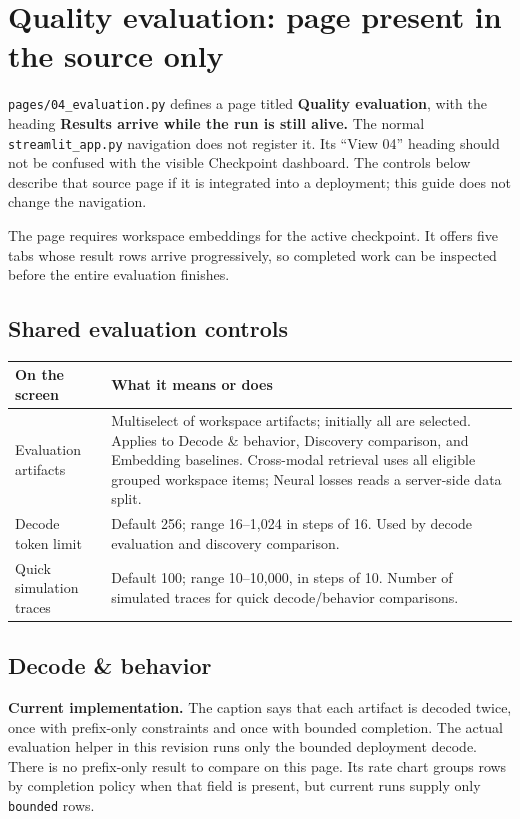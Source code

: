 \documentclass[11pt,a4paper]{article}
\makeatletter
\newcommand{\ui}[1]{\textbf{#1}}
\newcommand{\code}[1]{\nolinkurl{#1}}
\newenvironment{controls}{%
  \small\begin{longtable}{@{}>{\raggedright\arraybackslash}p{.34\linewidth}
    >{\raggedright\arraybackslash}p{.62\linewidth}@{}}
  \toprule\textbf{On the screen} & \textbf{What it means or does}\\\midrule\endhead
  \bottomrule\endfoot
}{\end{longtable}\normalsize}
\makeatother
\begin{document}
\appendix
\section{Quality evaluation: page present in the source only}
\label{sec:evaluation}
\code{pages/04_evaluation.py} defines a page titled \ui{Quality evaluation},
with the heading \ui{Results arrive while the run is still alive.} The normal
\code{streamlit_app.py} navigation does not register it. Its ``View 04''
heading should not be confused with the visible Checkpoint dashboard. The
controls below describe that source page if it is integrated into a deployment;
this guide does not change the navigation.

The page requires workspace embeddings for the active checkpoint. It offers
five tabs whose result rows arrive progressively, so completed work can be
inspected before the entire evaluation finishes.

\subsection{Shared evaluation controls}
\begin{controls}
Evaluation artifacts & Multiselect of workspace artifacts; initially all are
selected. Applies to Decode \& behavior, Discovery comparison, and Embedding
baselines. Cross-modal retrieval uses all eligible grouped workspace items;
Neural losses reads a server-side data split.\\
Decode token limit & Default 256; range 16--1,024 in steps of 16. Used by
decode evaluation and discovery comparison.\\
Quick simulation traces & Default 100; range 10--10,000, in steps of 10.
Number of simulated traces for quick decode/behavior comparisons.\\
\end{controls}

\subsection{Decode \& behavior}
\textbf{Current implementation.} The caption says that each artifact is decoded
twice, once with prefix-only constraints and once with bounded completion.
The actual evaluation helper in this revision runs only the bounded deployment
decode. There is no prefix-only result to compare on this page. Its rate chart
groups rows by completion policy when that field is present, but current runs
supply only \code{bounded} rows.
\end{document}
